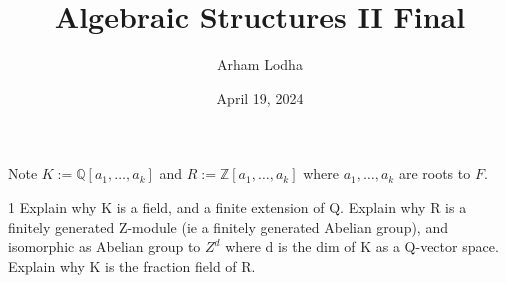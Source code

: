 \documentclass{article}
\newcommand{\Q}{\mathbb{Q}}
\newcommand{\Z}{\mathbb{Z}}
\begin{document}
\title{Algebraic Structures II Final}
\author{Arham Lodha}%
\date{April 19, 2024}%
\maketitle

Note $K := \Q[a_1, \dots, a_k]$ and $R := \Z[a_1, \dots, a_k]$ where $a_1, \dots, a_k$ are roots to $F$.     

\begin{PROB}{1}\label{Problem 1.}
    Explain why K is a field, and a finite extension of Q. Explain why R is a finitely generated Z-module (ie a finitely generated Abelian group), and isomorphic as Abelian group to $Z^d$ where d is the dim of K as a Q-vector space. Explain why K is the fraction field of R.
\end{PROB}
\end{document}
